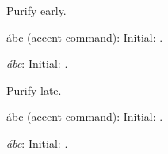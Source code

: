 \documentclass[12pt]{article}
\begin{document}
Purify early. 

\'{a}bc (accent command):  Initial: \result. 

\emph{ábc}:  Initial: \result. 

Purify late. 

\'{a}bc (accent command):  Initial: \result. 

\emph{ábc}:  Initial: \result. 
\end{document}
